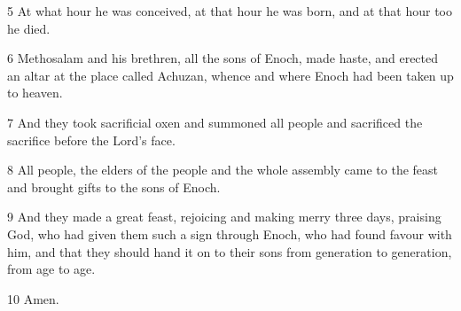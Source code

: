 \par 5 At what hour he was conceived, at that hour he was born, and at that hour too he died.

\par 6 Methosalam and his brethren, all the sons of Enoch, made haste, and erected an altar at the place called Achuzan, whence and where Enoch had been taken up to heaven.

\par 7 And they took sacrificial oxen and summoned all people and sacrificed the sacrifice before the Lord's face.

\par 8 All people, the elders of the people and the whole assembly came to the feast and brought gifts to the sons of Enoch.

\par 9 And they made a great feast, rejoicing and making merry three days, praising God, who had given them such a sign through Enoch, who had found favour with him, and that they should hand it on to their sons from generation to generation, from age to age.

\par 10 Amen.




